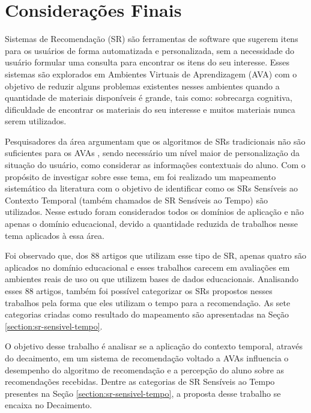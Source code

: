 \chapter{Considerações Finais}\label{chapter:conclusoes}

Sistemas de Recomendação (SR) são ferramentas de software que sugerem itens para os usuários de forma automatizada e personalizada,
sem a necessidade do usuário formular uma consulta para encontrar os itens do seu interesse. Esses sistemas são
explorados em Ambientes Virtuais de Aprendizagem (AVA) com o objetivo de reduzir alguns problemas existentes nesses ambientes
quando a quantidade de materiais disponíveis é grande, tais como: sobrecarga cognitiva, dificuldade de encontrar os materiais
do seu interesse e muitos materiais nunca serem utilizados.

Pesquisadores da área argumentam que os algoritmos de SRs tradicionais não são suficientes para os AVAs \cite{verbert2012context, drachsler2015panorama},
sendo necessário um nível maior de personalização da situação do usuário, como considerar as informações contextuais do aluno.
Com o propósito de investigar sobre esse tema, em  foi realizado um mapeamento sistemático da
literatura com o objetivo de identificar como os SRs Sensíveis ao Contexto Temporal (também chamados de SR Sensíveis ao
Tempo) são utilizados. Nesse estudo foram considerados todos os domínios de aplicação e não apenas o domínio educacional,
devido a quantidade reduzida de trabalhos nesse tema aplicados à essa área.

Foi observado que, dos 88 artigos que utilizam esse tipo de SR, apenas quatro são aplicados no domínio educacional e esses
trabalhos carecem em avaliações em ambientes reais de uso ou que utilizem bases de dados educacionais. Analisando esses
88 artigos, também foi possível categorizar os SRs propostos nesses trabalhos pela forma que eles utilizam o tempo para
a recomendação. As sete categorias criadas como resultado do mapeamento são apresentadas na Seção \ref{section:sr-sensivel-tempo}.

O objetivo desse trabalho é analisar se a aplicação do contexto temporal, através do decaimento, em um sistema de recomendação
voltado a AVAs influencia o desempenho do algoritmo de recomendação e a percepção do aluno sobre as recomendações
recebidas. Dentre as categorias de SR Sensíveis ao Tempo presentes na Seção \ref{section:sr-sensivel-tempo}, a proposta
desse trabalho se encaixa no Decaimento.


